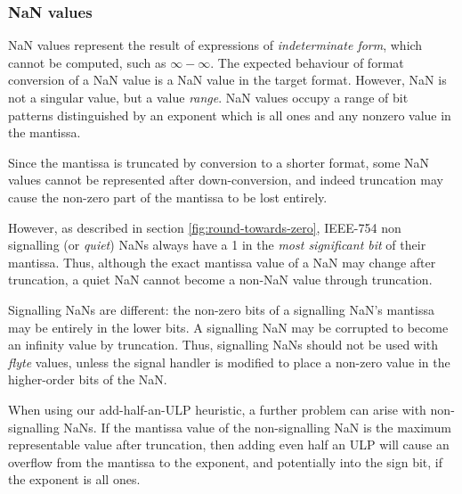 \documentclass{sig-alternate-05-2015}
\begin{document}
\subsubsection{NaN values}

NaN values represent the result of expressions of \emph{indeterminate form},
which cannot be computed, such as $\infty-\infty$. The expected behaviour of
format conversion of a NaN value is a NaN value in the target format. However,
NaN is not a singular value, but a value \emph{range}. NaN values occupy a
range of bit patterns distinguished by an exponent which is all ones and any
nonzero value in the mantissa.

Since the mantissa is truncated by conversion to a shorter format,
some NaN values cannot be represented after down-conversion, and
indeed truncation may cause the non-zero part of the mantissa to be
lost entirely.

However, as described in section \ref{fig:round-towards-zero}, IEEE-754 non
signalling (or \textit{quiet}) NaNs always have a 1 in the \emph{most
significant bit} of their mantissa. Thus, although the exact mantissa value of
a NaN may change after truncation, a quiet NaN cannot become a non-NaN value
through truncation.

Signalling NaNs are different: the non-zero bits of a signalling NaN's
mantissa may be entirely in the lower bits. A signalling NaN may be
corrupted to become an infinity value by truncation. Thus, signalling
NaNs should not be used with \textit{flyte} values, unless the signal
handler is modified to place a non-zero value in the higher-order bits
of the NaN.

When using our add-half-an-ULP heuristic, a further problem can arise with
non-signalling NaNs. If the mantissa value of the non-signalling NaN is the
maximum representable value after truncation, then adding even half an ULP will
cause an overflow from the mantissa to the exponent, and potentially into the
sign bit, if the exponent is all ones.
\end{document}
